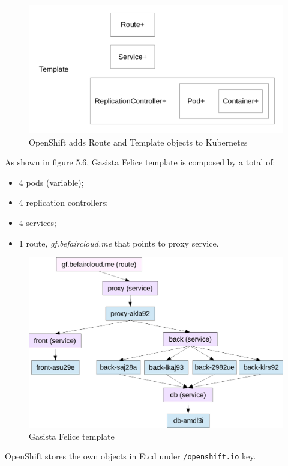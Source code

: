 \begin{figure}[htbp]
\centering
\includegraphics{media/ch5-template.png}
\caption{OpenShift adds Route and Template objects to Kubernetes}
\end{figure}

As shown in figure 5.6, Gasista Felice template is composed by a total of:

\begin{itemize}
\item 4 pods (variable);
\item 4 replication controllers;
\item 4 services;
\item 1 route, \textit{gf.befaircloud.me} that points to proxy service.
\end{itemize}

\begin{figure}[htbp]
\centering
\includegraphics{media/ch5-template-gf.png}
\caption{Gasista Felice template}
\end{figure}

OpenShift stores the own objects in Etcd under \texttt{/openshift.io} key.

